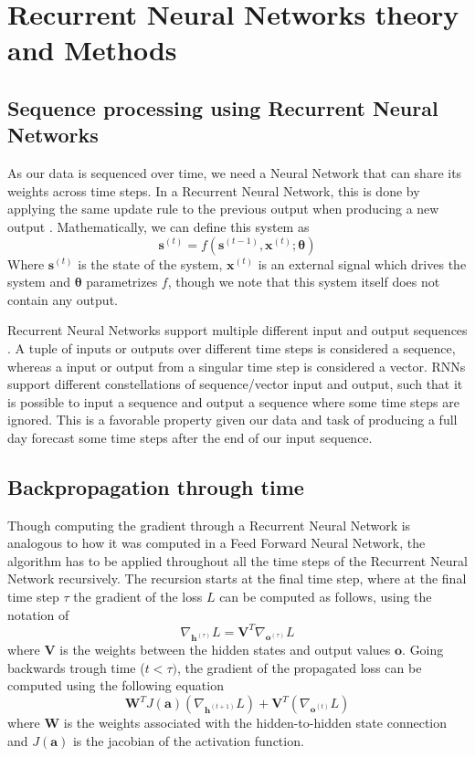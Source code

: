 \documentclass
[twocolumn,
secnumarabic,
nobibnotes,
aps,
prl,
reprint,
groupedaddress,
amsmath,
amssymb,
]{revtex4-2}
\begin{document}
\section{Recurrent Neural Networks theory and Methods}

\subsection{Sequence processing using Recurrent Neural Networks}
As our data is sequenced over time, we need a Neural Network that can share its weights across time steps. In a Recurrent Neural Network, this is done by applying the same update rule to the previous output when producing a new output \cite{Goodfellow2016}. Mathematically, we can define this system as
\begin{equation}
  \nonumber
  \bm{s}^{(t)} = f(\bm{s}^{(t-1)},\bm{x}^{(t)};\bm{\theta})
\end{equation}
Where $\bm{s}^{(t)}$ is the state of the system, $\bm{x}^{(t)}$ is an external signal which drives the system and $\bm{\theta}$ parametrizes $f$, though we note that this system itself does not contain any output. 

Recurrent Neural Networks support multiple different input and output sequences \cite{Geron2019}. A tuple of inputs or outputs over different time steps is considered a sequence, whereas a input or output from a singular time step is considered a vector. RNNs support different constellations of sequence/vector input and output, such that it is possible to input a sequence and output a sequence where some time steps are ignored. This is a favorable property given our data and task of producing a full day forecast some time steps after the end of our input sequence.

\subsection{Backpropagation through time}
Though computing the gradient through a Recurrent Neural Network is analogous to how it was computed in a Feed Forward Neural Network, the algorithm has to be applied throughout all the time steps of the Recurrent Neural Network recursively. The recursion starts at the final time step, where at the final time step $\tau$ the gradient of the loss $L$ can be computed as follows, using the notation of \cite{Goodfellow2016}
\begin{equation}
  \nabla_{\bm{h}^{(\tau)}}L = \bm{V}^T \nabla_{\bm{o}^{(\tau)}}L
\end{equation}
where $\bm{V}$ is the weights between the hidden states and output values $\bm{o}$.
Going backwards trough time ($t < \tau)$, the gradient of the propagated loss can be computed using the following equation
\begin{equation}
  \bm{W}^TJ(\bm{a})(\nabla_{\bm{h}^{(t+1)}}L)+\bm{V}^T(\nabla_{\bm{o}^{(t)}}L)
\end{equation}
where $\bm{W}$ is the weights associated with the hidden-to-hidden state connection and $J(\bm{a})$ is the jacobian of the activation function.%
\end{document}
